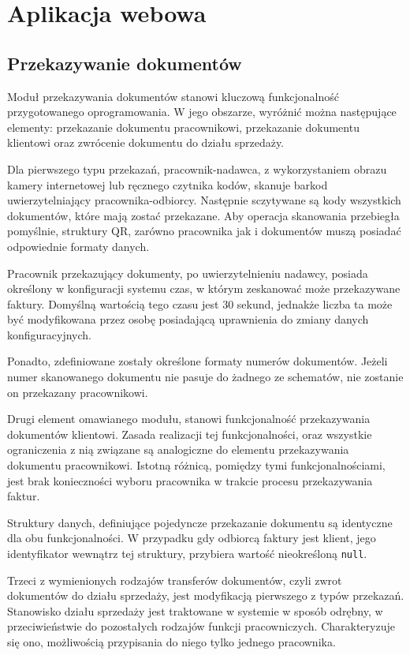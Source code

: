 \section{Aplikacja webowa}
\subsection{Przekazywanie dokumentów}
Moduł przekazywania dokumentów stanowi kluczową funkcjonalność przygotowanego oprogramowania. W jego obszarze, wyróżnić można następujące elementy: przekazanie dokumentu pracownikowi, przekazanie dokumentu klientowi oraz zwrócenie dokumentu do działu sprzedaży.

Dla pierwszego typu przekazań, pracownik-nadawca, z wykorzystaniem obrazu kamery internetowej lub ręcznego czytnika kodów, skanuje barkod uwierzytelniający pracownika-odbiorcy. Następnie sczytywane są kody wszystkich dokumentów, które mają zostać przekazane. Aby operacja skanowania przebiegła pomyślnie, struktury QR, zarówno pracownika jak i dokumentów muszą posiadać odpowiednie formaty danych.

Pracownik przekazujący dokumenty, po uwierzytelnieniu nadawcy, posiada określony w konfiguracji systemu czas, w którym zeskanować może przekazywane faktury. Domyślną wartością tego czasu jest 30 sekund, jednakże liczba ta może być modyfikowana przez osobę posiadającą uprawnienia do zmiany danych konfiguracyjnych.

Ponadto, zdefiniowane zostały określone formaty numerów dokumentów. Jeżeli numer skanowanego dokumentu nie pasuje do żadnego ze schematów, nie zostanie on przekazany pracownikowi.

Drugi element omawianego modułu, stanowi funkcjonalność przekazywania dokumentów klientowi. Zasada realizacji tej funkcjonalności, oraz wszystkie ograniczenia z nią związane są analogiczne do elementu przekazywania dokumentu pracownikowi. Istotną różnicą, pomiędzy tymi funkcjonalnościami, jest brak konieczności wyboru pracownika w trakcie procesu przekazywania faktur.

Struktury danych, definiujące pojedyncze przekazanie dokumentu są identyczne dla obu funkcjonalności. W przypadku gdy odbiorcą faktury jest klient, jego identyfikator wewnątrz tej struktury, przybiera wartość nieokreśloną \texttt{null}.

Trzeci z wymienionych rodzajów transferów dokumentów, czyli zwrot dokumentów do działu sprzedaży, jest modyfikacją pierwszego z typów przekazań. Stanowisko działu sprzedaży jest traktowane w systemie w sposób odrębny, w przeciwieństwie do pozostałych rodzajów funkcji pracowniczych. Charakteryzuje się ono, możliwością przypisania do niego tylko jednego pracownika.

